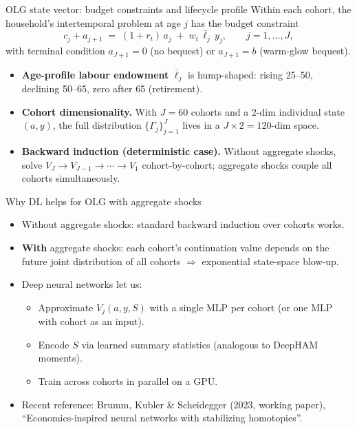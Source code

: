 \begin{frame}{OLG state vector: budget constraints and lifecycle profile}
Within each cohort, the household's intertemporal problem at age $j$ has the budget constraint
\[
c_j + a_{j+1} \;=\; (1+r_t)\,a_j \;+\; w_t\,\bar\ell_j\, y_j, \qquad j = 1, \ldots, J,
\]
with terminal condition $a_{J+1} = 0$ (no bequest) or $a_{J+1} = b$ (warm-glow bequest).
\medskip
\begin{itemize}
\item \textbf{Age-profile labour endowment} $\bar\ell_j$ is hump-shaped: rising 25--50, declining 50--65, zero after 65 (retirement).
\item \textbf{Cohort dimensionality.} With $J = 60$ cohorts and a 2-dim individual state $(a, y)$, the full distribution $\{\Gamma_j\}_{j=1}^J$ lives in a $J \times 2 = 120$-dim space.
\item \textbf{Backward induction (deterministic case).} Without aggregate shocks, solve $V_J \to V_{J-1} \to \cdots \to V_1$ cohort-by-cohort; aggregate shocks couple all cohorts simultaneously.
\end{itemize}
\end{frame}

\begin{frame}{Why DL helps for OLG with aggregate shocks}
\begin{itemize}
\item Without aggregate shocks: standard backward induction over cohorts works.
\medskip
\item \textbf{With} aggregate shocks: each cohort's continuation value depends on the future joint distribution of all cohorts $\Rightarrow$ exponential state-space blow-up.
\medskip
\item Deep neural networks let us:
  \begin{itemize}
  \item Approximate $V_j(a, y, S)$ with a single MLP per cohort (or one MLP with cohort as an input).
  \item Encode $S$ via learned summary statistics (analogous to DeepHAM moments).
  \item Train across cohorts in parallel on a GPU.
  \end{itemize}
\medskip
\item Recent reference: Brumm, Kubler \& Scheidegger (2023, working paper), ``Economics-inspired neural networks with stabilizing homotopies''.
\end{itemize}
\end{frame}

